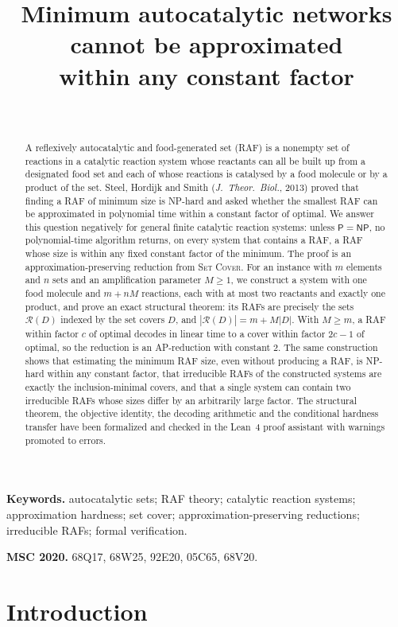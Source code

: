 \documentclass[11pt,a4paper]{article}
\title{Minimum autocatalytic networks cannot be approximated\\ within any constant factor}
\author{\PaperAuthor\\ \PaperAffiliation}
\date{\PaperDate}
\theoremstyle{plain}
\theoremstyle{definition}
\theoremstyle{remark}
\newcommand{\cR}{\mathcal{R}}
\newcommand{\SetCover}{\textup{\textsc{Set Cover}}}
\newcommand{\NP}{\mathsf{NP}}
\newcommand{\Ptime}{\mathsf{P}}
\begin{document}
\maketitle

\begin{abstract}
A reflexively autocatalytic and food-generated set (RAF) is a nonempty set of reactions in a catalytic reaction system whose reactants can all be built up from a designated food set and each of whose reactions is catalysed by a food molecule or by a product of the set. Steel, Hordijk and Smith (\emph{J.\ Theor.\ Biol.}, 2013) proved that finding a RAF of minimum size is NP-hard and asked whether the smallest RAF can be approximated in polynomial time within a constant factor of optimal. We answer this question negatively for general finite catalytic reaction systems: unless $\Ptime=\NP$, no polynomial-time algorithm returns, on every system that contains a RAF, a RAF whose size is within any fixed constant factor of the minimum. The proof is an approximation-preserving reduction from \SetCover. For an instance with $m$ elements and $n$ sets and an amplification parameter $M\ge 1$, we construct a system with one food molecule and $m+nM$ reactions, each with at most two reactants and exactly one product, and prove an exact structural theorem: its RAFs are precisely the sets $\cR(D)$ indexed by the set covers $D$, and $|\cR(D)|=m+M|D|$. With $M\ge m$, a RAF within factor $c$ of optimal decodes in linear time to a cover within factor $2c-1$ of optimal, so the reduction is an AP-reduction with constant $2$. The same construction shows that estimating the minimum RAF size, even without producing a RAF, is NP-hard within any constant factor, that irreducible RAFs of the constructed systems are exactly the inclusion-minimal covers, and that a single system can contain two irreducible RAFs whose sizes differ by an arbitrarily large factor. The structural theorem, the objective identity, the decoding arithmetic and the conditional hardness transfer have been formalized and checked in the Lean~4 proof assistant with warnings promoted to errors.
\end{abstract}

\noindent\textbf{Keywords.} autocatalytic sets; RAF theory; catalytic reaction systems; approximation hardness; set cover; approximation-preserving reductions; irreducible RAFs; formal verification.

\medskip
\noindent\textbf{MSC 2020.} 68Q17, 68W25, 92E20, 05C65, 68V20.

\section{Introduction}\label{sec:intro}
\end{document}
